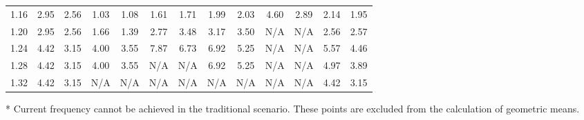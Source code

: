 \documentclass[journal]{IEEEtran}
\begin{document}
\begin{table}[htbp]
\begin{threeparttable}
\begin{tabular}{c|cc|cc|cc|cc|cc||cc}
     1.16 & 2.95	& 2.56   & 1.03 &	1.08 &	 1.61 & 1.71 &	 1.99 &	 2.03  &	 4.60 &	 2.89 &2.14 & 1.95\\
     1.20 & 2.95	& 2.56   & 1.66 &	1.39 &	 2.77 &	3.48 &	3.17 &	 3.50  &	 N/A\tnote{*}	  & N/A\tnote{*} & 2.56 & 2.57 \\
     1.24 & 4.42	& 3.15  & 4.00 &	3.55 &	 7.87 &	6.73 &	6.92 &	 5.25  &	 N/A\tnote{*}	  & N/A\tnote{*} & 5.57 & 4.46\\
     1.28 & 4.42	& 3.15   & 4.00 &	3.55 &	 N/A\tnote{*}	    &   N/A\tnote{*}     &	6.92 &	 5.25  &	N/A\tnote{*}	  & N/A\tnote{*} & 4.97& 3.89\\
     1.32 & 4.42	& 3.15   & N/A\tnote{*}	  &	 N/A\tnote{*}	    &	 N/A\tnote{*}	    &	 N/A\tnote{*}   & N/A\tnote{*}   & N/A\tnote{*}    &    N/A\tnote{*}   & N/A\tnote{*} & 4.42	& 3.15 \\
     \hline
     \hline
   \end{tabular}
   \normalsize
   \begin{tablenotes}
   \footnotesize
    \item[*] Current frequency cannot be achieved in the traditional scenario. These points are excluded from the calculation of geometric means.
   \end{tablenotes}
   \end{threeparttable}
   \label{Ratio_MRE}
 \end{table}
\end{document}
